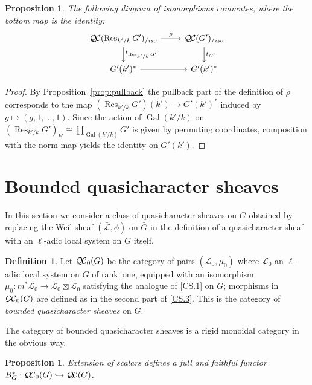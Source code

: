 \documentclass[11pt]{amsart}
\theoremstyle{plain}
\newtheorem{proposition}[theorem]{Proposition}
\theoremstyle{definition}
\newtheorem{definition}[theorem]{Definition}
\theoremstyle{remark}
\newcommand{\EE}{\mathbb{\bar Q}_\ell}
\DeclareMathOperator{\Gal}{Gal}
\DeclareMathOperator{\Res}{Res}
\newcommand{\sheafHom}{{\mathscr{H}\hskip-4pt{\it o}\hskip-2pt{\it m}}}
\newcommand{\ceq}{{\, :=\, }}
\newcommand{\qcs}[1]{{\mathcal{#1}}}
\newcommand{\gqcs}[1]{{\mathcal{\bar #1}}}
\newcommand{\QC}{{\mathcal{Q\hskip-0.8pt C}}}
\newcommand{\QCb}{{\QC_0}}
\newcommand{\QCiso}[1]{\QC(#1)_{/\textit{iso}}}
\newcommand{\trFrob}[1]{t_{#1}}
\newcommand{\bG}{\bar{G}}
\begin{document}
\begin{proposition}
The following diagram of isomorphisms commutes, where the bottom map is the identity:
\[
\begin{tikzcd}
\QCiso{\Res_{k'/k} G'} \dar{\trFrob{\Res_{k'/k} G'}} \rar{\rho} & \QCiso{G'} \dar{\trFrob{G'}}\\
G'(k')^* \rar & G'(k')^*
\end{tikzcd}
\]
\end{proposition}
\begin{proof}
By Proposition~\ref{prop:pullback} the pullback part of the definition of $\rho$ corresponds to the map $(\Res_{k'/k}G')(k') \to G'(k')^*$
induced by $g \mapsto (g, 1, \ldots, 1)$.  Since the action of $\Gal(k'/k)$ on $(\Res_{k'/k}G')_{k'} \cong \prod_{\Gal(k'/k)} G'$
is given by permuting coordinates, composition with the norm map yields the identity on $G'(k')$.
\end{proof}

\section{Bounded quasicharacter sheaves}\label{sec:bounded}

In this section we consider a class of quasicharacter sheaves on $G$ obtained by
replacing the Weil sheaf $(\gqcs{L}, \phi)$ on $\bG$ in the definition of a quasicharacter
sheaf with an $\ell$-adic local system on $G$ itself.

\begin{definition}
Let $\QCb(G)$ be the category of pairs $(\qcs{L}_0,\mu_0)$ 
where $\qcs{L}_0$ an $\ell$-adic local system on $G$ of rank~one, 
equipped with an isomorphism $\mu_0 : m^* \qcs{L}_0 \to \qcs{L}_0 \boxtimes \qcs{L}_0$ 
satisfying the analogue of \ref{CS.1} on $G$; 
morphisms in $\QCb(G)$ are defined as in the second part of 
\ref{CS.3}. 
This is the category of \emph{bounded quasicharacter sheaves} on $G$. 
\end{definition}

The category of bounded quasicharacter sheaves is a rigid monoidal category in the obvious way. 

\begin{proposition}
Extension of scalars defines a full and faithful functor 
$B_G^* : \QCb(G) \hookrightarrow \QC(G)$.
\end{proposition}
\end{document}

